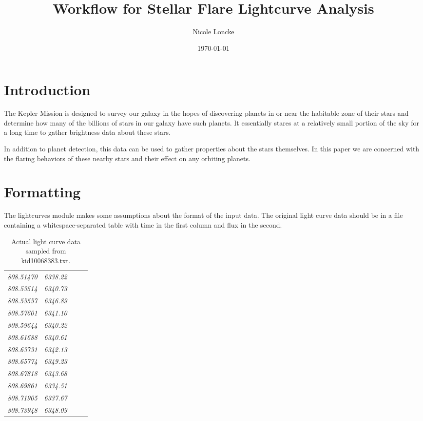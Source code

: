 \documentclass{article}
\author{Nicole Loncke}
\date{\today}
\title{Workflow for Stellar Flare Lightcurve Analysis}
\begin{document}
\maketitle{}

\section{Introduction}
\label{sec:intro}

The Kepler Mission is designed to survey our galaxy in the hopes of
discovering planets in or near the habitable zone of their stars and
determine how many of the billions of stars in our galaxy have such
planets. It essentially stares at a relatively small portion of the
sky for a long time to gather brightness data about these stars.

In addition to planet detection, this data can be used to gather
properties about the stars themselves.  In this paper we are concerned
with the flaring behaviors of these nearby stars and their effect on
any orbiting planets.

\section{Formatting}
\label{sec:format}

The lightcurves module makes some assumptions about the format of the
input data.  The original light curve data should be in a file
containing a whitespace-separated table with time in the first column
and flux in the second.
\begin{table}[h]
  \centering
  \begin{tabular}{>{\itshape}p{0.2\linewidth} >{\itshape}l}
       808.51470   &   6338.22 \\
       808.53514   &   6340.73 \\
       808.55557   &   6346.89 \\
       808.57601   &   6341.10 \\
       808.59644   &   6340.22 \\
       808.61688   &   6340.61 \\
       808.63731   &   6342.13 \\
       808.65774   &   6349.23 \\
       808.67818   &   6343.68 \\
       808.69861   &   6334.51 \\
       808.71905   &   6337.67 \\
       808.73948   &   6348.09 \\
  \end{tabular}
  \caption{Actual light curve data sampled from kid10068383.txt.}
\end{table}
\end{document}
